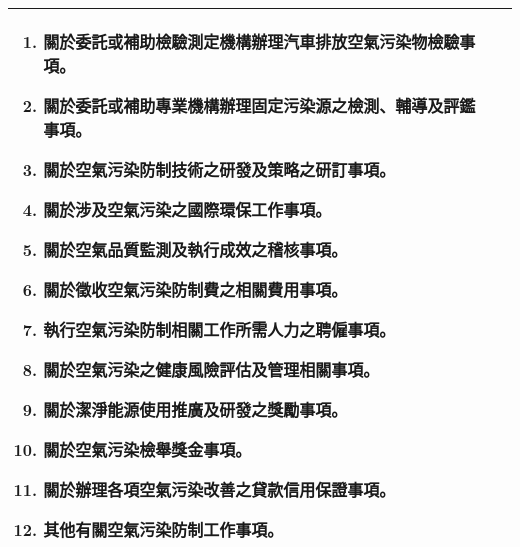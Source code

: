 \begin{table}[h]
\begin{tabular}{|p{7.5cm}|p{7.5cm}|}
\begin{enumerate}[label=\zhnum*、,topsep=0.5em, partopsep=0pt, itemsep=0pt, parsep=0pt,leftmargin=3em]
    \item  關於委託或補助檢驗測定機構辦理汽車排放空氣污染物檢驗事項。
    \item  關於委託或補助專業機構辦理固定污染源之檢測、輔導及評鑑事項。
    \item  關於空氣污染防制技術之研發及策略之研訂事項。
    \item  關於涉及空氣污染之國際環保工作事項。
    \item  關於空氣品質監測及執行成效之稽核事項。
    \item  關於徵收空氣污染防制費之相關費用事項。
    \item  執行空氣污染防制相關工作所需人力之聘僱事項。
    \item  關於空氣污染之健康風險評估及管理相關事項。
    \item  \textbf{關於潔淨能源使用推廣及研發之獎勵事項。}
    \item  關於空氣污染檢舉獎金事項。
    \item  關於辦理各項空氣污染改善之貸款信用保證事項。
    \item  其他有關空氣污染防制工作事項。
    \end{enumerate} \\
    \hline
    \end{tabular}
    \label{tab:usage}
    \end{table}
  
  